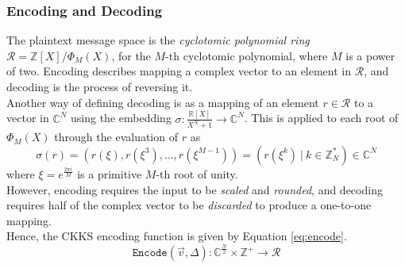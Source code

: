 \subsubsection{Encoding and Decoding}
\indent \indent
The plaintext message space is the \textit{cyclotomic polynomial ring} $\mathcal{R} = \mathbb{Z}[X] / \Phi_M(X)$,  for the $M$-th cyclotomic polynomial, where $M$ is a power of two. Encoding describes mapping a complex vector to an element in $\mathcal{R}$, and decoding is the process of reversing it.
\smallskip \\ \indent
Another way of defining decoding is as a mapping of an element $r \in \mathcal{R}$ to a vector in $\mathbb{C}^N$ using the embedding $\sigma : \frac{\mathbb{R}[X]}{X^N + 1} \rightarrow \mathbb{C}^N$. This is applied to each root of $\Phi_M(X)$ through the evaluation of $r$ as
\begin{equation}
    \sigma(r) = (r(\xi), r(\xi^3), \ldots, r(\xi^{M-1})) = (r(\xi^k) \: | \: k \in \mathbb{Z}^*_N) \in \mathbb{C}^N
\end{equation}
where $\xi = e^{\frac{2 \pi i}{M}}$ is a primitive $M$-th root of unity.
\smallskip \\ \indent
However, encoding requires the input to be \textit{scaled} and \textit{rounded}, and decoding requires half of the complex vector to be \textit{discarded} to produce a one-to-one mapping.
\smallskip \\ \indent
Hence, the CKKS encoding function is given by Equation \ref{eq:encode}.
\begin{equation}
    \label{eq:encode}
    \texttt{Encode}(\vec{v}, \Delta) : \mathbb{C}^\frac{N}{2} \times \mathbb{Z}^+ \rightarrow \mathcal{R}
\end{equation}
